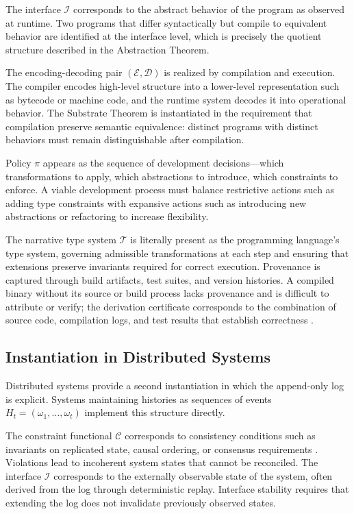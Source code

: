 \documentclass[12pt, a4paper]{article}
\theoremstyle{plain}
\theoremstyle{definition}
\theoremstyle{remark}
\begin{document}
The interface $\mathcal{I}$ corresponds to the abstract behavior of the program as observed at runtime. Two programs that differ syntactically but compile to equivalent behavior are identified at the interface level, which is precisely the quotient structure described in the Abstraction Theorem.

The encoding-decoding pair $(\mathcal{E}, \mathcal{D})$ is realized by compilation and execution. The compiler encodes high-level structure into a lower-level representation such as bytecode or machine code, and the runtime system decodes it into operational behavior. The Substrate Theorem is instantiated in the requirement that compilation preserve semantic equivalence: distinct programs with distinct behaviors must remain distinguishable after compilation.

Policy $\pi$ appears as the sequence of development decisions---which transformations to apply, which abstractions to introduce, which constraints to enforce. A viable development process must balance restrictive actions such as adding type constraints with expansive actions such as introducing new abstractions or refactoring to increase flexibility.

The narrative type system $\mathcal{T}$ is literally present as the programming language's type system, governing admissible transformations at each step and ensuring that extensions preserve invariants required for correct execution. Provenance is captured through build artifacts, test suites, and version histories. A compiled binary without its source or build process lacks provenance and is difficult to attribute or verify; the derivation certificate corresponds to the combination of source code, compilation logs, and test results that establish correctness \cite{pierce2002,harper2016}.

\subsection{Instantiation in Distributed Systems}

Distributed systems provide a second instantiation in which the append-only log is explicit. Systems maintaining histories as sequences of events $H_t = (\omega_1, \dots, \omega_t)$ implement this structure directly.

The constraint functional $\mathcal{C}$ corresponds to consistency conditions such as invariants on replicated state, causal ordering, or consensus requirements \cite{lamport1978}. Violations lead to incoherent system states that cannot be reconciled. The interface $\mathcal{I}$ corresponds to the externally observable state of the system, often derived from the log through deterministic replay. Interface stability requires that extending the log does not invalidate previously observed states.
\end{document}
